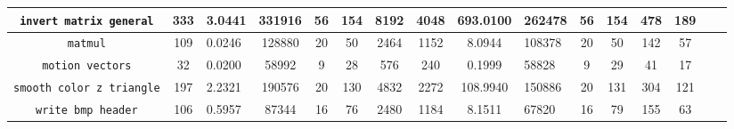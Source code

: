 \documentclass[a4paper, 11pt, oneside]{article}
\begin{document}
\begin{landscape}
\begin{table}[!h]
\begin{center}
\begin{tabular}{|c|c V{3} c|c|c|c|c|c V{3} c|c|c|c|c|c|}
    \texttt{invert matrix general}	  & 333 & 3.0441 & 331916 & 56 & 154 & 8192 & 4048 & 693.0100 & 262478 & 56 & 154 & 478 & 189 \\ \hline
    \texttt{matmul}									  & 109 & 0.0246 & 128880 & 20 &  50 & 2464 & 1152 & 8.0944 & 108378 & 20 & 50 & 142 & 57 \\ \hline
    \texttt{motion vectors}					  &  32 & 0.0200 &  58992 &  9 &  28 &  576 &  240 & 0.1999 & 58828 & 9 & 29 & 41 & 17 \\ \hline
    \texttt{smooth color z triangle}	& 197 & 2.2321 & 190576 & 20 & 130 & 4832 & 2272 & 108.9940 & 150886 & 20 & 131 & 304 & 121 \\ \hline
    \texttt{write bmp header}				  & 106 & 0.5957 &  87344 & 16 &  76 & 2480 & 1184 & 8.1511 & 67820 & 16 & 79 & 155 & 63 \\ \hline
  \end{tabular}
  \end{center}
\end{table}

\clearpage

\end{landscape}
\end{document}
